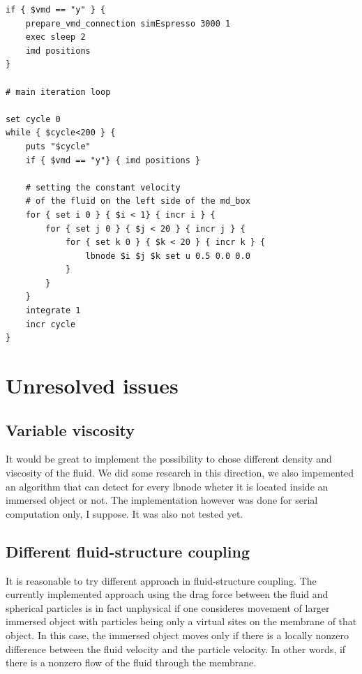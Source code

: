 \documentclass[a4paper]{article}
\begin{document}
\begin{verbatim}
if { $vmd == "y" } {
    prepare_vmd_connection simEspresso 3000 1
    exec sleep 2   
    imd positions
}

# main iteration loop

set cycle 0 
while { $cycle<200 } {
    puts "$cycle"
    if { $vmd == "y"} { imd positions }

    # setting the constant velocity
    # of the fluid on the left side of the md_box
    for { set i 0 } { $i < 1} { incr i } {
        for { set j 0 } { $j < 20 } { incr j } {
            for { set k 0 } { $k < 20 } { incr k } {
                lbnode $i $j $k set u 0.5 0.0 0.0
            }
        }
    }
    integrate 1
    incr cycle
}

\end{verbatim}

\section{Unresolved issues}\label{sec:unresolved}
\subsection{Variable viscosity}\label{subsec:viscosity}
It would be great to implement the possibility to chose different density and viscosity of the fluid. We did some research in this direction, we also impemented an algorithm that can detect for every lbnode wheter it is located inside an immersed object or not. The implementation however was done for serial computation only, I suppose. It was also not tested yet.

\subsection{Different fluid-structure coupling}\label{subsec:coupling}
It is reasonable to try different approach in fluid-structure coupling. The currently implemented approach using the drag force between the fluid and spherical particles is in fact unphysical if one consideres movement of larger immersed object with particles being only a virtual sites on the membrane of that object. In this case, the immersed object moves only if there is a locally nonzero difference between the fluid velocity and the particle velocity. In other words, if there is a nonzero flow of the fluid through the membrane.
\end{document}
